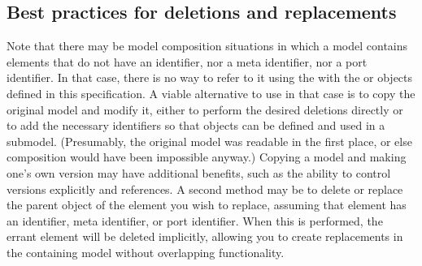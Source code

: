 

\subsection{Best practices for deletions and replacements}
\label{best-practices-deletions-replacements}

Note that there may be model composition situations in which a model
contains elements that do not have an identifier, nor a meta identifier,
nor a port identifier.  In that case, there is no way to refer to it
using the with the \Deletion or \ReplacedElement objects defined in this specification.  A viable alternative to use in
that case is to copy the original model and modify it, either to perform
the desired deletions directly or to add the necessary identifiers so
that \Deletion objects can be defined and used in a submodel.
(Presumably, the original model was readable in the first place, or else
composition would have been impossible anyway.)  Copying a model and
making one's own version may have additional benefits, such as the
ability to control versions explicitly and references.  A second method may be to delete or replace the parent object of the element you wish to replace, assuming that element has an identifier, meta identifier, or port identifier.  When this is performed, the errant element will be deleted implicitly, allowing you to create replacements in the containing model without overlapping functionality.

